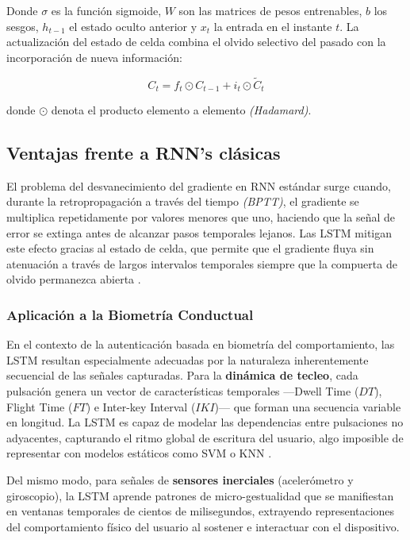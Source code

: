 Donde $\sigma$ es la función sigmoide, $W$ son las matrices de pesos 
entrenables, $b$ los sesgos, $h_{t-1}$ el estado oculto anterior y $x_t$ 
la entrada en el instante $t$. La actualización del estado de celda combina 
el olvido selectivo del pasado con la incorporación de nueva información:

\begin{equation}
    C_t = f_t \odot C_{t-1} + i_t \odot \tilde{C}_t
\end{equation}

donde $\odot$ denota el producto elemento a elemento \textit{(Hadamard)}.

\subsection{Ventajas frente a RNN's clásicas}

El problema del desvanecimiento del gradiente en RNN estándar surge cuando, 
durante la retropropagación a través del tiempo \textit{(BPTT)}, el gradiente 
se multiplica repetidamente por valores menores que uno, haciendo que la señal 
de error se extinga antes de alcanzar pasos temporales lejanos. Las LSTM 
mitigan este efecto gracias al estado de celda, que permite que el gradiente 
fluya sin atenuación a través de largos intervalos temporales siempre que la 
compuerta de olvido permanezca abierta \cite{goodfellow2016deep}.

\subsubsection{Aplicación a la Biometría Conductual}

En el contexto de la autenticación basada en biometría del comportamiento, 
las LSTM resultan especialmente adecuadas por la naturaleza inherentemente 
secuencial de las señales capturadas. Para la \textbf{dinámica de tecleo}, 
cada pulsación genera un vector de características temporales —Dwell Time 
($DT$), Flight Time ($FT$) e Inter-key Interval ($IKI$)— que forman una 
secuencia variable en longitud. La LSTM es capaz de modelar las dependencias 
entre pulsaciones no adyacentes, capturando el ritmo global de escritura 
del usuario, algo imposible de representar con modelos estáticos como SVM 
o KNN \cite{acien2022keystroke}.

Del mismo modo, para señales de \textbf{sensores inerciales} (acelerómetro 
y giroscopio), la LSTM aprende patrones de micro-gestualidad que se 
manifiestan en ventanas temporales de cientos de milisegundos, extrayendo 
representaciones del comportamiento físico del usuario al sostener e 
interactuar con el dispositivo.

